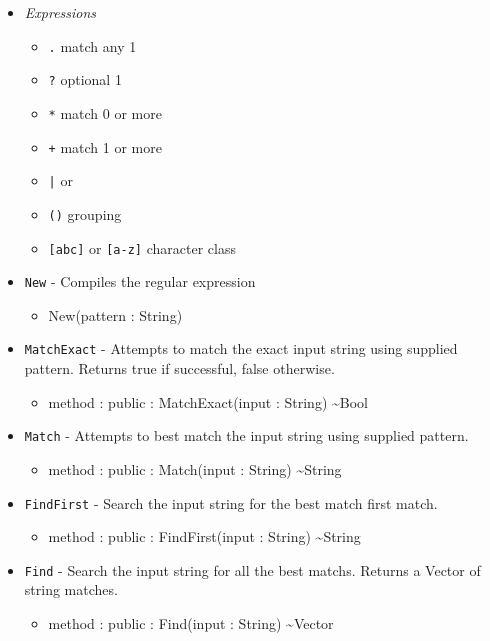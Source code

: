 \documentclass[11pt]{article}
\begin{document}
\begin{itemize}
\item \textit{Expressions}
  \begin{itemize}
  \item \texttt{.} match any 1
  \item \texttt{?} optional 1
  \item \texttt{*} match 0 or more
  \item \texttt{+} match 1 or more
  \item \texttt{|} or
  \item \texttt{()} grouping
  \item \texttt{[abc]} or \texttt{[a-z]} character class
  \end{itemize}
\end{itemize}

\begin{itemize}
\item \texttt{New} - Compiles the regular expression
  \begin{itemize}
  \item New(pattern : String)
  \end{itemize}

\item \texttt{MatchExact} - Attempts to match the exact input string using supplied pattern.
  Returns true if successful, false otherwise. 
  \begin{itemize}
  \item method : public : MatchExact(input : String) \textasciitilde Bool
  \end{itemize}

\item \texttt{Match} - Attempts to best match the input string using supplied pattern.
  \begin{itemize}
  \item method : public : Match(input : String) \textasciitilde String
  \end{itemize}

\item \texttt{FindFirst} - Search the input string for the best match first match.
  \begin{itemize}
  \item method : public : FindFirst(input : String) \textasciitilde String
  \end{itemize}

\item \texttt{Find} - Search the input string for all the best matchs. Returns a Vector of string matches.
  \begin{itemize}
  \item method : public : Find(input : String) \textasciitilde Vector
  \end{itemize}
\end{itemize}
\end{document}
